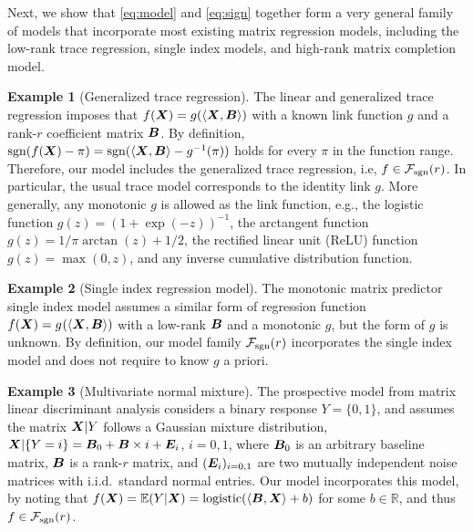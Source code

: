 \documentclass[11pt]{article}
\theoremstyle{plain}
\theoremstyle{definition}
\newtheorem{example}{Example}
\def\caliF{\tF_{\textup{sgn}}}
\def\sign{\textup{sgn}}
\def\caliF{\tF_{\textup{sgn}}}
\begin{document}
Next, we show that \eqref{eq:model} and \eqref{eq:sign} together form a very general family of models that incorporate most existing matrix regression models, including the low-rank trace regression, single index models, and high-rank matrix completion model. 

\begin{example}[Generalized trace regression] The linear and generalized trace regression \citep{zhou2014regularized, wang2017generalized, fan2019generalized} imposes that $f(\bm X)=g(\langle \bm X, \bm B \rangle)$ with a known link function $g$ and a rank-$r$ coefficient matrix $\bm B$. By definition, $\sign(f(\mX)-\pi)=\sign(\langle \mX, \mB \rangle -g^{-1}(\pi))$ holds for every $\pi$ in the function range. Therefore, our model includes the generalized trace regression, i.e, $f \in \caliF(r)$. In particular, the usual trace model corresponds to the identity link $g$. More generally, any monotonic $g$ is allowed as the link function, e.g., the logistic function $g(z)=(1+\exp(-z))^{-1}$, the arctangent function $g(z)={1/\pi}\arctan(z)+{1/2}$, the rectified linear unit (ReLU) function $g(z)=\max(0,z)$, and any inverse cumulative distribution function. 
\end{example}

\begin{example}[Single index regression model] 
The monotonic matrix predictor single index model \citep{balabdaoui2019least,ganti2017learning} assumes a similar form of regression function $f(\bm X)=g^{}(\langle \bm X, \bm B\rangle)$ with a low-rank $\bm B$ and a monotonic $g$, but the form of $g$ is unknown. By definition, our model family $\caliF(r)$ incorporates the single index model and does not require to know $g$ a priori. 
\end{example}

\begin{example}[Multivariate normal mixture]
The prospective model from matrix linear discriminant analysis \citep{hu2020matrix} considers a binary response $Y=\{0,1\}$, and assumes the matrix $\bm X|Y$ follows a Gaussian mixture distribution, $\bm X|\{Y=i\} = \bm B_0 + \bm B\times i + \bm{E}_i$, $i=0,1$, where $\bm B_0$ is an arbitrary baseline matrix, $\bm B$ is a rank-$r$ matrix, and $(\bm{E}_i)_{i=0,1}$ are two mutually independent noise matrices with i.i.d.\ standard normal entries. Our model incorporates this model, by noting that $f(\bm X)=\mathbb{E}(Y|\bm X)=\text{logistic}(\langle \bm B, \bm X \rangle+b)$ for some $b\in\mathbb{R}$, and thus $f\in \caliF(r)$. 
\end{example}
\end{document}
